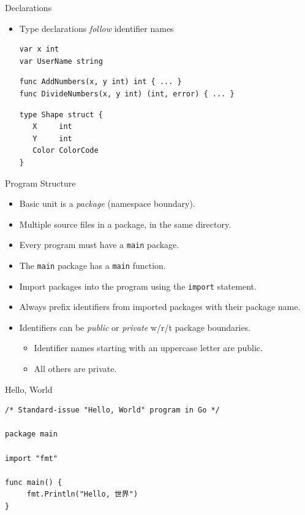\documentclass[pdf]{beamer}
\newcommand\z[1]{\texttt{#1}}
\newcommand\identifier[1]{{\color{green!70!black}\z{#1}}}
\newcommand\keyword[1]{{\color{blue}\z{#1}}}
\begin{document}
\begin{frame}[fragile]{Declarations}
    \begin{itemize}
        \item Type declarations \emph{follow} identifier names
\begin{lstlisting}
var x int
var UserName string
\end{lstlisting}
\pause
\begin{lstlisting}
func AddNumbers(x, y int) int { ... }
func DivideNumbers(x, y int) (int, error) { ... }
\end{lstlisting}
\pause
\begin{lstlisting}
type Shape struct {
   X     int
   Y     int
   Color ColorCode
}
\end{lstlisting}
    \end{itemize}
\end{frame}
\begin{frame}{Program Structure}
    \begin{itemize}
        \item Basic unit is a \emph{package} (namespace boundary).\pause
        \item Multiple source files in a package, in the same directory.\pause
        \item Every program must have a \identifier{main} package.
        \item The \identifier{main} package has a \identifier{main} function.\pause
        \item Import packages into the program using the \keyword{import} statement.
        \item Always prefix identifiers from imported packages with their package name.\pause
        \item Identifiers can be \emph{public} or \emph{private} w/r/t package boundaries.\pause
            \begin{itemize}
                \item Identifier names starting with an uppercase letter are public.
                \item All others are private.
            \end{itemize}
    \end{itemize}
\end{frame}

\begin{frame}[fragile]{Hello, World}
\begin{lstlisting}
/* Standard-issue "Hello, World" program in Go */

package main

import "fmt"

func main() {
     fmt.Println("Hello, 世界")
}
\end{lstlisting}
\end{frame}
\end{document}

